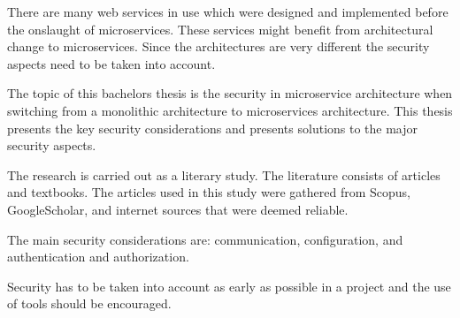 \begin{enabstract}
    \begin{sloppypar}
        There are many web services in use which were designed and implemented 
        before the onslaught of microservices. These services might benefit 
        from architectural change to microservices. Since the architectures
        are very different the security aspects need to be taken into account.
    \end{sloppypar}
    \begin{sloppypar}    
        The topic of this bachelors thesis is the security in microservice 
        architecture when switching from a monolithic architecture to 
        microservices architecture. This thesis presents the key security 
        considerations and presents solutions to the major security aspects.
    \end{sloppypar}
    \begin{sloppypar}
        The research is carried out as a literary study.
        The literature consists of articles and textbooks.
        The articles used in this study were gathered from Scopus, 
        GoogleScholar, and internet sources that were deemed reliable.
    \end{sloppypar}
    \begin{sloppypar}
        The main security considerations are: communication, configuration, 
        and authentication and authorization. 
    \end{sloppypar}
    \begin{sloppypar}
        Security has to be taken into account as early as possible in a project 
        and the use of tools should be encouraged.
    \end{sloppypar}
\end{enabstract}
